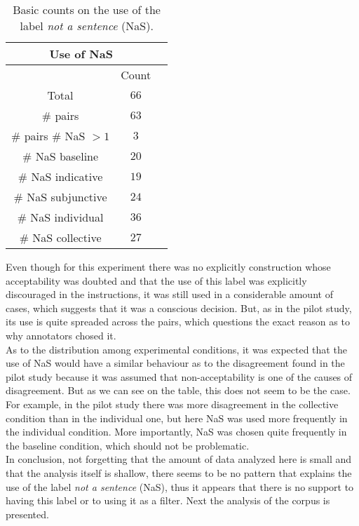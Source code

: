 \begin{table}
\center
\begin{tabular}{|c|c|c|}
\hline
\multicolumn{2}{|c|}{Use of NaS}\\\hline
                      & Count\\\hline 
Total & $66$\\\hline 
\# pairs & $63$ \\\hline
\# pairs \# NaS $>1$ & $3$\\\hline
\# NaS baseline & $20$\\\hline
\# NaS indicative & $19$\\\hline
\# NaS subjunctive & $24$\\\hline
\# NaS individual & $36$\\\hline
\# NaS collective& $27$\\\hline
\end{tabular}
\caption[Use of NaS]{Basic counts on the use of the label \textit{not a sentence} (NaS).}
\label{tab:nas}
\end{table}

Even though for this experiment there was no explicitly construction whose acceptability was doubted and that the use of this label was explicitly discouraged in the instructions, it was still used in a considerable amount of cases, which suggests that it was a conscious decision. But, as in the pilot study, its use is quite spreaded across the pairs, which questions the exact reason as to why annotators chosed it.\\

As to the distribution among experimental conditions, it was expected that the use of NaS would have a similar behaviour as to the disagreement found in the pilot study because it was assumed that non-acceptability is one of the causes of disagreement. But as we can see on the table, this does not seem to be the case. For example, in the pilot study there was more disagreement in the collective condition than in the individual one, but here NaS was used more frequently in the individual condition. More importantly, NaS was chosen quite frequently in the baseline condition, which should not be problematic.\\

In conclusion, not forgetting that the amount of data analyzed here is small and that the analysis itself is shallow, there seems to be no pattern that explains the use of the label \textit{not a sentence} (NaS), thus it appears that there is no support to having this label or to using it as a filter. Next the analysis of the corpus is presented.\\ 

